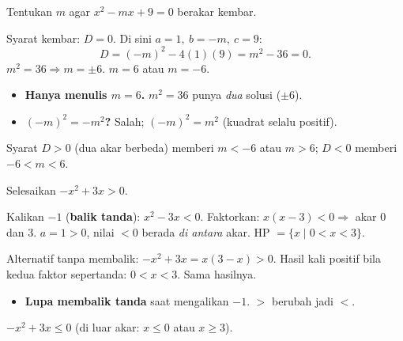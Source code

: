 \begin{soalbox}{}
Tentukan $m$ agar $x^2-mx+9=0$ berakar kembar.
\end{soalbox}

\jawab
{} Syarat kembar: $D=0$. Di sini $a=1,\ b=-m,\ c=9$:
\[
D=(-m)^2-4(1)(9)=m^2-36=0.
\]
 $m^2=36\Rightarrow m=\pm6$.
\jadi $m=6$ atau $m=-6$.

\begin{jebakan}
\begin{itemize}[leftmargin=*,topsep=2pt]
  \item \textbf{Hanya menulis $m=6$.} $m^2=36$ punya \emph{dua} solusi
  ($\pm6$).
  \item \textbf{$(-m)^2=-m^2$?} Salah; $(-m)^2=m^2$ (kuadrat selalu positif).
\end{itemize}
\end{jebakan}

\begin{variasi}
Syarat $D>0$ (dua akar berbeda) memberi $m<-6$ atau $m>6$; $D<0$ memberi
$-6<m<6$.
\end{variasi}

\begin{soalbox}{}
Selesaikan $-x^2+3x>0$.
\end{soalbox}

\jawab
{} Kalikan $-1$ (\textbf{balik tanda}): $x^2-3x<0$.
 Faktorkan: $x(x-3)<0\Rightarrow$ akar $0$ dan $3$.
 $a=1>0$, nilai $<0$ berada \emph{di antara} akar.
\jadi HP $=\{x\mid 0<x<3\}$.

\begin{tips}
Alternatif tanpa membalik: $-x^2+3x=x(3-x)>0$. Hasil kali positif bila kedua
faktor sepertanda: $0<x<3$. Sama hasilnya.
\end{tips}

\begin{jebakan}
\begin{itemize}[leftmargin=*,topsep=2pt]
  \item \textbf{Lupa membalik tanda} saat mengalikan $-1$. $>$ berubah jadi $<$.
\end{itemize}
\end{jebakan}

\begin{variasi}
$-x^2+3x\le0$ (di luar akar: $x\le0$ atau $x\ge3$).
\end{variasi}

